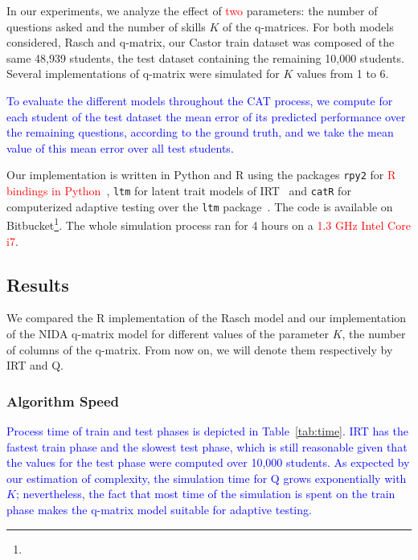 \documentclass{sig-alternate}
\newcommand\alert[1]{\textcolor{red}{#1}}
\newcommand\note[1]{\textcolor{blue}{#1}}
\begin{document}
In our experiments, we analyze the effect of \alert{two} parameters: the number of questions asked and the number of skills $K$ of the q-matrices. For both models considered, Rasch and q-matrix, our Castor train dataset was composed of the same 48,939 students, the test dataset containing the remaining 10,000 students. Several implementations of q-matrix were simulated for $K$ values from 1 to 6.

\note{To evaluate the different models throughout the CAT process, we compute for each student of the test dataset the mean error of its predicted performance over the remaining questions, according to the ground truth, and we take the mean value of this mean error over all test students.}

Our implementation is written in Python and R using the packages \texttt{rpy2} for \alert{R bindings in Python}~\cite{Gautier2008}, \texttt{ltm} for latent trait models of IRT~\cite{Rizopoulos2006} and \texttt{catR} for computerized adaptive testing over the \texttt{ltm} package~\cite{MagisRaiche2012}. The code is available on Bitbucket\footnote{}. The whole simulation process ran for 4 hours on a \alert{1.3 GHz Intel Core i7}. %

\subsection{Results}

We compared the R implementation of the Rasch model and our implementation of the NIDA q-matrix model for different values of the parameter $K$, the number of columns of the q-matrix. From now on, we will denote them respectively by IRT and Q.

\subsubsection{Algorithm Speed}

\note{Process time of train and test phases is depicted in Table~\ref{tab:time}. IRT has the fastest train phase and the slowest test phase, which is still reasonable given that the values for the test phase were computed over 10,000 students. As expected by our estimation of complexity, the simulation time for Q grows exponentially with $K$; nevertheless, the fact that most time of the simulation is spent on the train phase makes the q-matrix model suitable for adaptive testing.}
\end{document}
